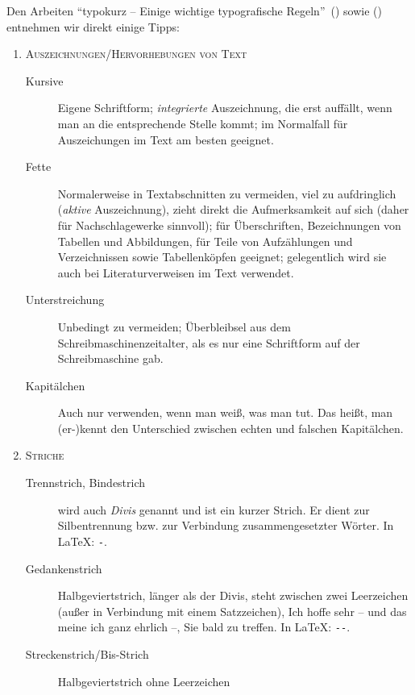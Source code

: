 %
Den Arbeiten \enquote{typokurz -- Einige wichtige typografische Regeln}~(\textcite{Bier:09}) sowie  (\textcite{Struckmann:07}) entnehmen wir direkt einige Tipps:
%
\begin{enumerate}
   \item \textsc{Auszeichnungen/Hervorhebungen von Text}
      \begin{description}
         \item[Kursive] Eigene Schriftform; \emph{integrierte} 
                      Auszeichnung, die erst auffällt, wenn man an die entsprechende Stelle kommt; 
                      im Normalfall für Auszeichungen im Text am besten geeignet.
         \item[Fette] Normalerweise in Textabschnitten zu vermeiden, viel zu
                      aufdringlich (\emph{aktive} Auszeichnung), zieht direkt die Aufmerksamkeit auf sich (daher für Nachschlagewerke sinnvoll); 
                      für Überschriften, Bezeichnungen von Tabellen und Abbildungen, für Teile von Aufzählungen und Verzeichnissen sowie Tabellenköpfen geeignet;  gelegentlich wird sie auch bei Literaturverweisen im Text verwendet.
         \item[Unterstreichung] Unbedingt zu vermeiden; Überbleibsel aus dem
                      Schreibmaschinenzeitalter, als es nur eine Schriftform auf der Schreibmaschine gab.
         \item[Kapitälchen] Auch nur verwenden, wenn man weiß, was man tut.
                      Das heißt, man (er-)kennt den Unterschied zwischen echten und falschen Kapitälchen.
      \end{description}
   \item \textsc{Striche}
      \begin{description}
         \item[Trennstrich, Bindestrich] wird auch \emph{Divis} genannt und ist
                      ein kurzer Strich. Er dient zur Silbentrennung bzw. zur Verbindung zusammengesetzter Wörter. 
                      In \LaTeX{}: \verb|-|.
         \item[Gedankenstrich] Halbgeviertstrich, länger als der Divis, steht
                      zwischen zwei Leerzeichen (außer in Verbindung mit einem Satzzeichen), \zB{} Ich hoffe sehr -- und das meine ich ganz ehrlich --, Sie bald zu treffen. 
                      In \LaTeX{}: \verb|--|.
         \item[Streckenstrich/Bis-Strich] Halbgeviertstrich ohne Leerzeichen

\end{description}
\end{enumerate}
